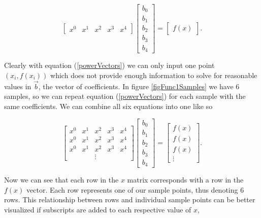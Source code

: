\begin{equation} \label{powerVectors}
\begin{bmatrix}
x^0 & x^1 & x^2 & x^3 & x^4
\end{bmatrix}
\begin{bmatrix}
b_0 \\
b_1 \\
b_2 \\
b_3 \\
b_4 
\end{bmatrix}
=
\begin{bmatrix}
f(x)
\end{bmatrix} .
\end{equation}

\par Clearly with equation (\ref{powerVectors}) we can only input one point $(x_i,f(x_i))$ which does not provide enough information to solve for reasonable values in $\vec{b}$, the vector of coefficients. In figure \ref{figFunc1Samples} we have 6 samples, so we can repeat equation (\ref{powerVectors}) for each sample with the same coefficients. We can combine all six equations into one like so

\begin{equation} \label{LinAlgGeneral}
\begin{bmatrix}
x^0 & x^1 & x^2 & x^3 & x^4 \\
x^0 & x^1 & x^2 & x^3 & x^4 \\
x^0 & x^1 & x^2 & x^3 & x^4 \\
& & \vdots & &
\end{bmatrix}
\begin{bmatrix}
b_0 \\
b_1 \\
b_2 \\
b_3 \\
b_4 
\end{bmatrix}
=
\begin{bmatrix}
f(x) \\ 
f(x) \\
f(x) \\ 
\vdots
\end{bmatrix} .
\end{equation}

\par Now we can see that each row in the $x$ matrix corresponds with a row in the $f(x)$ vector. Each row represents one of our sample points, thus denoting 6 rows. This relationship between rows and individual sample points can be better visualized if subscripts are added to each respective value of $x$,


